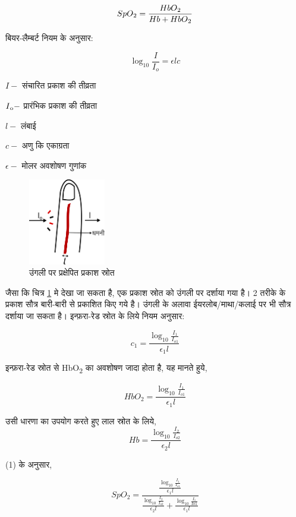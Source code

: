 	\begin{equation}
		SpO\textsubscript{2} = \frac{HbO\textsubscript{2}}{Hb + 	HbO\textsubscript{2}}
	\end{equation}
	
	बियर-लैम्बर्ट नियम के अनुसार:
	
	\begin{equation}		
		\log_{10}\frac{I}{I_o} = \epsilon l c
	\end{equation}	
	
	$I -$ संचारित प्रकाश की तीव्रता
	
	$I\textsubscript{o}-$ प्रारंभिक प्रकाश की तीव्रता

	$l -$ लंबाई
	
	$c -$ अणु कि एकाग्रता
	
	$\epsilon -$ मोलर अवशोषण गुणांक\par
	\medskip
	
	\begin{figure}[ht!]
		\centering
		\includegraphics[width=0.3\textwidth]{images/finger_hi.png}
		\caption{उंगली पर प्रक्षेपित प्रकाश स्रोत}
		\label{fig:finger}
	\end{figure}
	
	जैसा कि चित्र \ref{fig:finger} मे देखा जा सकता है, एक प्रकाश स्रोत को उंगली पर दर्शाया गया है।
	2 तरीके के प्रकाश सौत्र बारी-बारी से प्रकाशित किए गये है। उंगली के अलावा ईयरलोब/माथा/कलाई पर भी सौत्र दर्शाया जा सकता है। इन्फ़रा-रेड स्रोत के लिये नियम अनुसार:
	
	\[	
	c_1 = 	\frac{\log_{10}\frac{I_1}{I_{o1}}}{\epsilon_1 l}
	\]	
	
	इन्फ़रा-रेड स्रोत से HbO\textsubscript{2} का अवशोषण जादा होता है, यह मानते हुये,
	
	\[	
	HbO_2 = \frac{\log_{10}\frac{I_1}{I_{o1}}}{\epsilon_1 	l}
	\]	
	
	उसी धारणा का उपयोग करते हुए लाल स्रोत के लिये,
	\[	
	Hb = \frac{\log_{10}\frac{I_2}{I_{o2}}}{\epsilon_2 	l}
	\]
	
	(1) के अनुसार,
	
	\[	
	SpO_2 =  \frac{\frac{\log_{10}\frac{I_1}{I_{o1}}}{\epsilon_1 l}}		
	{\frac{\log_{10}\frac{I_2}{I_{o2}}}{\epsilon_2 l} + 	\frac{\log_{10}\frac{I_1}{I{o1}}}{\epsilon_1 l}}
	\]	
	
